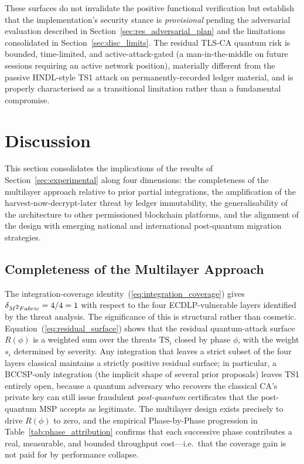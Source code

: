 \documentclass{ieeetj}
\newcommand{\mfabric}{M\textsuperscript{2}Fabric}
\begin{document}
These surfaces do not invalidate the positive functional verification but
establish that the implementation's security stance is \textit{provisional}
pending the adversarial evaluation described in
Section~\ref{sec:res_adversarial_plan} and the limitations consolidated
in Section~\ref{sec:disc_limits}.
The residual TLS-CA quantum risk is bounded, time-limited, and active-attack-gated
(a man-in-the-middle on future sessions requiring an active network position),
materially different from the passive HNDL-style TS1 attack on
permanently-recorded ledger material, and is properly characterised as a
transitional limitation rather than a fundamental compromise.

\section{Discussion} \label{sec:discussion}

This section consolidates the implications of the results of
Section~\ref{sec:experimental} along four dimensions: the completeness of
the multilayer approach relative to prior partial integrations, the
amplification of the harvest-now-decrypt-later threat by ledger
immutability, the generalisability of the architecture to other permissioned
blockchain platforms, and the alignment of the design with emerging national
and international post-quantum migration strategies.

\subsection{Completeness of the Multilayer Approach}
\label{sec:disc_completeness}

The integration-coverage identity~(\ref{eq:integration_coverage}) gives
$\delta_{\mfabric{}}=4/4=1$ with respect to the four ECDLP-vulnerable layers
identified by the threat analysis. The significance of this is structural
rather than cosmetic. Equation~(\ref{eq:residual_surface}) shows that the
residual quantum-attack surface $R(\phi)$ is a weighted sum over the
threats $\mathrm{TS}_i$ closed by phase $\phi$, with the weight $s_i$
determined by severity. Any integration that leaves a strict subset of the
four layers classical maintains a strictly positive residual surface; in
particular, a BCCSP-only integration (the implicit shape of several prior
proposals) leaves TS1 entirely open, because a quantum adversary who
recovers the classical CA's private key can still issue fraudulent
\emph{post-quantum} certificates that the post-quantum MSP accepts as
legitimate. The multilayer design exists precisely to drive $R(\phi)$ to
zero, and the empirical Phase-by-Phase progression in
Table~\ref{tab:phase_attribution} confirms that each successive phase
contributes a real, measurable, and bounded throughput cost---i.e.\ that
the coverage gain is not paid for by performance collapse.
\end{document}
